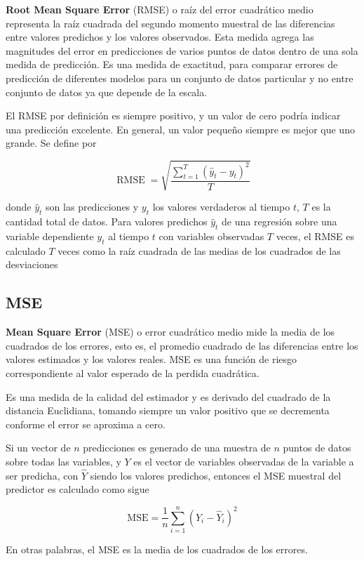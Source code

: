 \textbf{Root Mean Square Error} (RMSE) o raíz del error cuadrático medio representa la raíz cuadrada del segundo momento muestral de las diferencias entre valores predichos y los valores observados. Esta medida agrega las magnitudes del error en predicciones de varios puntos de datos dentro de una sola medida de predicción.
Es una medida de exactitud, para comparar errores de predicción de diferentes modelos para un conjunto de datos particular y no entre conjunto de datos ya que depende de la escala.

El RMSE por definición es siempre positivo, y un valor de cero podría indicar una predicción excelente. En general, un valor pequeño siempre es mejor que uno grande. Se define por

\[
\operatorname{RMSE}=\sqrt{\frac{\sum_{t=1}^{T}\left(\hat{y}_{t}-y_{t}\right)^{2}}{T}}
\] 

donde $\hat{y}_t$ son las predicciones y $y_t$ los valores verdaderos al tiempo $t$, $T$ es la cantidad total de datos.
Para valores predichos $\hat{y}_t$ de una regresión sobre una variable dependiente $y_t$ al tiempo $t$ con variables observadas $T$ veces, el RMSE es calculado $T$ veces como la raíz cuadrada de las medias de los cuadrados de las desviaciones

\subsection{MSE}

\textbf{Mean Square Error} (MSE) o error cuadrático medio mide la media de los cuadrados de los errores, esto es, el promedio cuadrado de las diferencias entre los valores estimados y los valores reales. MSE es una función de riesgo correspondiente al valor esperado de la perdida cuadrática.

Es una medida de la calidad del estimador y es derivado del cuadrado de la distancia Euclidiana, tomando siempre un valor positivo que se decrementa conforme el error se aproxima a cero.

Si un vector de $n$ predicciones es generado de una muestra de $n$ puntos de datos sobre todas las variables, y $Y$ es el vector de variables observadas de la variable a ser predicha, con $\hat{Y}$ siendo los valores predichos, entonces el MSE muestral del predictor es calculado como sigue 

\[
\mathrm{MSE}=\frac{1}{n} \sum_{i=1}^{n}\left(Y_{i}-\hat{Y}_{i}\right)^{2}
\]

En otras palabras, el MSE es la media de los cuadrados de los errores. 

